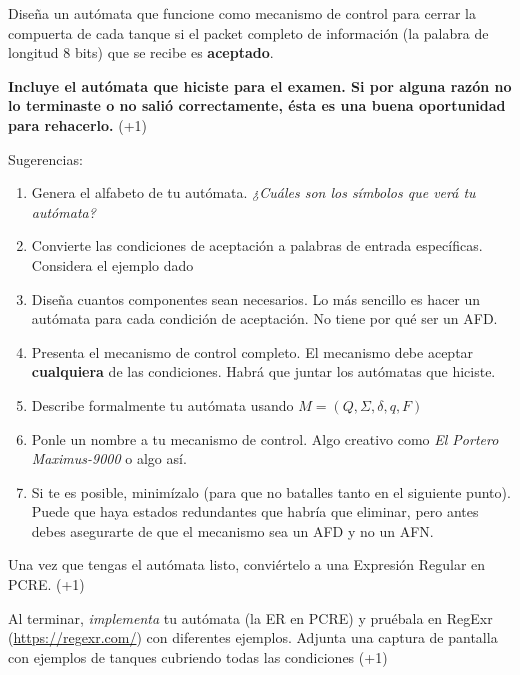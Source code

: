 \documentclass[]{book}
\theoremstyle{definition}
\begin{document}
Diseña un autómata que funcione como mecanismo de control para cerrar la compuerta de cada tanque si el packet completo de información (la palabra de longitud 8 bits) que se recibe es \textbf{aceptado}.

\textbf{Incluye el autómata que hiciste para el examen. Si por alguna razón no lo terminaste o no salió correctamente, ésta es una buena oportunidad para rehacerlo.} (+1)

Sugerencias:

\begin{enumerate}[label=\tt \alph*)]
    \itemsep0em
    \item Genera el alfabeto de tu autómata. \textit{¿Cuáles son los símbolos que verá tu autómata?}
    \item Convierte las condiciones de aceptación a palabras de entrada específicas. Considera el ejemplo dado
    \item Diseña cuantos componentes sean necesarios. Lo más sencillo es hacer un autómata para cada condición de aceptación. No tiene por qué ser un AFD.
    \item Presenta el mecanismo de control completo. El mecanismo debe aceptar \textbf{cualquiera} de las condiciones. Habrá que juntar los autómatas que hiciste.
    \item Describe formalmente tu autómata usando $M = (Q, \Sigma, \delta, q, F)$
    \item Ponle un nombre a tu mecanismo de control. Algo creativo como \textit{El Portero Maximus-9000} o algo así.
    \item Si te es posible, minimízalo (para que no batalles tanto en el siguiente punto). Puede que haya estados redundantes que habría que eliminar, pero antes debes asegurarte de que el mecanismo sea un AFD y no un AFN.
\end{enumerate}

Una vez que tengas el autómata listo, conviértelo a una Expresión Regular en PCRE. (+1)

\vspace{4ex}

Al terminar, \textit{implementa} tu autómata (la ER en PCRE) y pruébala en RegExr (\url{https://regexr.com/})  con diferentes ejemplos. Adjunta una captura de pantalla con ejemplos de tanques cubriendo todas las condiciones (+1)
\end{document}

